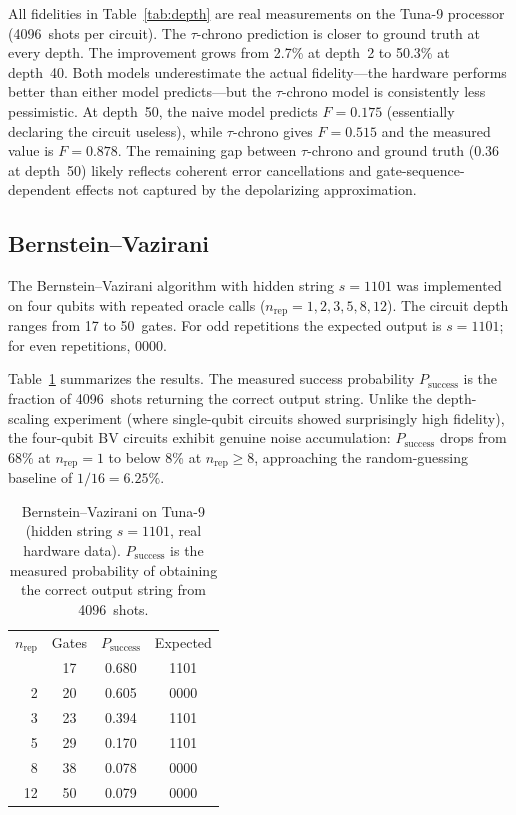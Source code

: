 \documentclass[prl,twocolumn,superscriptaddress,longbibliography]{revtex4-2}
\begin{document}
All fidelities in Table~\ref{tab:depth} are real measurements on the Tuna-9 processor (4096~shots per circuit). The $\tau$-chrono prediction is closer to ground truth at every depth. The improvement grows from 2.7\% at depth~2 to 50.3\% at depth~40. Both models underestimate the actual fidelity---the hardware performs better than either model predicts---but the $\tau$-chrono model is consistently less pessimistic. At depth~50, the naive model predicts $F = 0.175$ (essentially declaring the circuit useless), while $\tau$-chrono gives $F = 0.515$ and the measured value is $F = 0.878$. The remaining gap between $\tau$-chrono and ground truth (0.36 at depth~50) likely reflects coherent error cancellations and gate-sequence-dependent effects not captured by the depolarizing approximation.

\subsection{Bernstein--Vazirani}

The Bernstein--Vazirani algorithm with hidden string $s = 1101$ was implemented on four qubits with repeated oracle calls ($n_{\text{rep}} = 1, 2, 3, 5, 8, 12$). The circuit depth ranges from 17 to 50~gates. For odd repetitions the expected output is $s = 1101$; for even repetitions, $0000$.

Table~\ref{tab:bv} summarizes the results. The measured success probability $P_{\text{success}}$ is the fraction of 4096~shots returning the correct output string. Unlike the depth-scaling experiment (where single-qubit circuits showed surprisingly high fidelity), the four-qubit BV circuits exhibit genuine noise accumulation: $P_{\text{success}}$ drops from 68\% at $n_{\text{rep}} = 1$ to below 8\% at $n_{\text{rep}} \geq 8$, approaching the random-guessing baseline of $1/16 = 6.25\%$.

\begin{table}[b]
\caption{\label{tab:bv}Bernstein--Vazirani on Tuna-9 (hidden string $s = 1101$, real hardware data). $P_{\text{success}}$ is the measured probability of obtaining the correct output string from 4096~shots.}
\begin{ruledtabular}
\begin{tabular}{rccc}
$n_{\text{rep}}$ & Gates & $P_{\text{success}}$ & Expected \\
\colrule
1  & 17 & 0.680 & 1101 \\
2  & 20 & 0.605 & 0000 \\
3  & 23 & 0.394 & 1101 \\
5  & 29 & 0.170 & 1101 \\
8  & 38 & 0.078 & 0000 \\
12 & 50 & 0.079 & 0000 \\
\end{tabular}
\end{ruledtabular}
\end{table}
\end{document}

